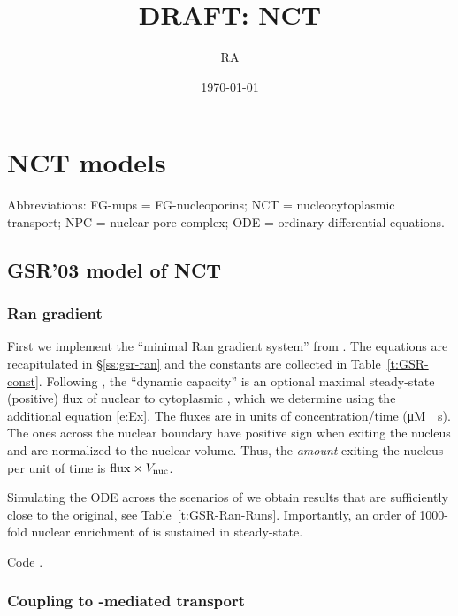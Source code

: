 \documentclass[12pt,notitlepage]{article}
\title{DRAFT: NCT}
\author{RA}
\date{\today}
\begin{document}
\maketitle

\section{NCT models}

Abbreviations:
FG-nups = FG-nucleoporins;
NCT = nucleocytoplasmic transport;
NPC = nuclear pore complex;
ODE = ordinary differential equations.

\subsection{GSR'03 model of NCT} \label{s:GSR03}

\subsubsection*{Ran gradient} \label{s:GSR03:Ran}

First we implement
the ``minimal Ran gradient system'' from 
\cite{GoerlichSeewaldRibbeck2003}.
%
%
The equations are recapitulated in
\S\ref{ss:gsr-ran}
and
the constants are collected in 
Table~\ref{t:GSR-const}.
%
%
Following \cite{GoerlichSeewaldRibbeck2003},
the ``dynamic capacity'' 
is an optional maximal steady-state (positive) flux
of nuclear  to cytoplasmic ,
which we determine using the additional equation \eqref{e:Ex}.
%
%
The fluxes 
are in units of concentration/time (\si{\micro M \per s}).
%
The ones across the nuclear boundary
have positive sign when exiting the nucleus
and are normalized to the nuclear volume.
%
Thus,
the \emph{amount} exiting the nucleus per unit of time is
$\ce{flux} \times V_\text{nuc}$.

%

Simulating the ODE
across the scenarios of 
\cite{GoerlichSeewaldRibbeck2003}
we obtain 
results that are sufficiently close
to the original,
see Table~\ref{t:GSR-Ran-Runs}.
%
%
Importantly,
an order of 1000-fold nuclear enrichment of 
is sustained in steady-state.
	
%

Code .

%

\subsubsection*{Coupling to -mediated transport} \label{s:GSR03:Imp}
\end{document}
